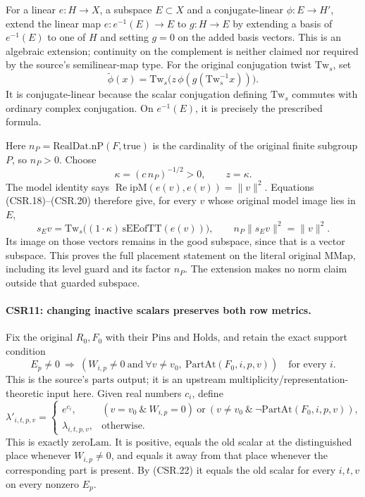 For a linear \(e:H\to X\), a subspace \(E\subset X\) and a
conjugate-linear \(\phi:E\to H'\), extend the linear map
\(e:e^{-1}(E)\to E\) to \(g:H\to E\) by extending a basis of
\(e^{-1}(E)\) to one of \(H\) and setting \(g=0\) on the
added basis vectors. This is an algebraic extension; continuity
on the complement is neither claimed nor required by the source's
semilinear-map type. For the original conjugation twist
\(\mathrm{Tw}_s\), set
\[
 \widetilde\phi(x)=
   \mathrm{Tw}_s\bigl(z\,\phi(g(\mathrm{Tw}_s^{-1}x))\bigr).
 \tag{CSR.19}
\]
It is conjugate-linear because the scalar conjugation defining
\(\mathrm{Tw}_s\) commutes with ordinary complex conjugation.
On \(e^{-1}(E)\), it is precisely the prescribed formula.

Here \(n_P=\mathrm{RealDat.nP}(F,\mathrm{true})\) is the
cardinality of the original finite subgroup \(P\), so \(n_P>0\).
Choose
\[
                  \kappa=(c\,n_P)^{-1/2}>0,\qquad z=\kappa.
 \tag{CSR.20}
\]
The model identity says
\(\operatorname{Re}\mathrm{ipM}(e(v),e(v))=\|v\|^2\).
Equations (CSR.18)--(CSR.20) therefore give, for every \(v\)
whose original model image lies in \(E\),
\[
 s_Ev=\mathrm{Tw}_s\bigl((1\cdot\kappa)\,
                   \mathrm{sEEofTT}(e(v))\bigr),\qquad
               n_P\|s_Ev\|^2=\|v\|^2 .                        \tag{CSR.21}
\]
Its image on those vectors remains in the good subspace, since
that is a vector subspace. This proves the full placement
statement on the literal original \(\mathrm{MMap}\), including
its level guard and its factor \(n_P\). The extension makes no
norm claim outside that guarded subspace.

\paragraph{CSR11: changing inactive scalars preserves both row metrics.}
\label{claim:CSR11}
Fix the original \(R_0,F_0\) with their \(\mathrm{Pins}\) and
\(\mathrm{Holds}\), and retain the exact support condition
\[
 E_p\ne0\ \Longrightarrow\
 \left(W_{i,p}\ne0\ \text{and}\
       \forall v\ne v_0,\ \mathrm{PartAt}(F_0,i,p,v)\right)
 \quad\text{for every }i.                                    \tag{CSR.22}
\]
This is the source's \(\mathrm{parts}\) output; it is an
upstream multiplicity/representation-theoretic input here.
Given real numbers \(c_i\), define
\[
 \lambda'_{i,t,p,v}=
 \begin{cases}
 e^{c_i},&
 (v=v_0\ \&\ W_{i,p}=0)\ \text{or}\
 (v\ne v_0\ \&\ \neg\mathrm{PartAt}(F_0,i,p,v)),\\
 \lambda_{i,t,p,v},&\text{otherwise}.
 \end{cases}                                                  \tag{CSR.23}
\]
This is exactly \(\mathrm{zeroLam}\). It is positive, equals
the old scalar at the distinguished place whenever \(W_{i,p}\ne0\),
and equals it away from that place whenever the corresponding
part is present. By (CSR.22) it equals the old scalar for
every \(i,t,v\) on every nonzero \(E_p\).

